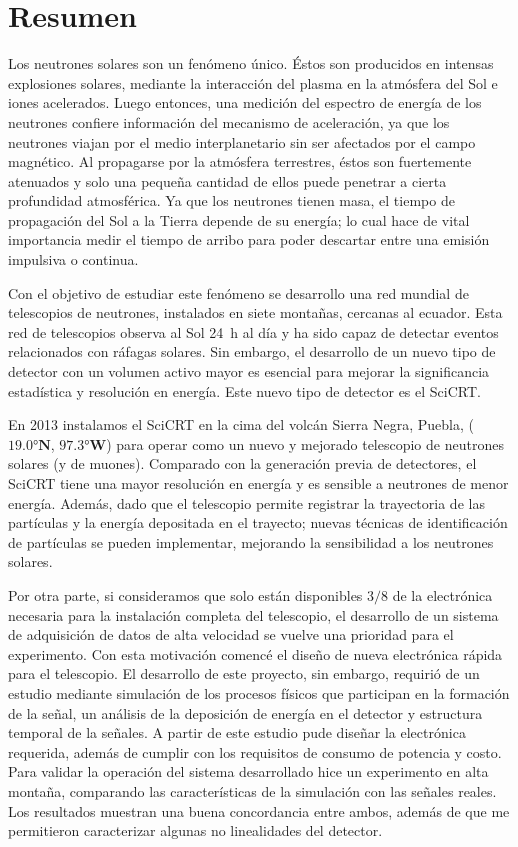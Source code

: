 
\pagestyle{empty}
\chapter{Resumen}

Los neutrones solares son un fenómeno único. Éstos son producidos en intensas explosiones solares, mediante la interacción del plasma en la atmósfera del Sol e iones acelerados. Luego entonces, una medición del espectro de energía de los neutrones confiere información del mecanismo de aceleración, ya que  los neutrones viajan por el medio interplanetario sin ser afectados por el campo magnético. Al propagarse por la atmósfera terrestres, éstos son fuertemente atenuados y solo una pequeña cantidad de ellos puede penetrar a cierta profundidad atmosférica. Ya que los neutrones tienen masa, el tiempo de propagación del Sol a la Tierra depende de su energía; lo cual hace de vital importancia medir el tiempo de arribo para poder descartar entre una emisión impulsiva o continua.

Con el objetivo de estudiar este fenómeno se desarrollo una red mundial de telescopios de neutrones, instalados en siete montañas, cercanas al ecuador. Esta red de telescopios observa al Sol \SI{24}{\hour} al día y ha sido capaz de detectar eventos relacionados con ráfagas solares. Sin embargo, el desarrollo de un nuevo tipo de detector con un volumen activo mayor es esencial para mejorar la significancia estadística y resolución en energía. Este nuevo tipo de detector es el SciCRT.

En \num{2013} instalamos el SciCRT en la cima del volcán Sierra Negra, Puebla, ($\ang{19.0}\mathbf{N}$, $\ang{97.3}\mathbf{W}$) para operar como un nuevo y mejorado telescopio de neutrones solares (y de muones). Comparado con la generación previa de detectores, el SciCRT tiene una mayor resolución en energía y es sensible a neutrones de menor energía. Además, dado que el telescopio permite registrar la trayectoria de las partículas y la energía depositada en el trayecto; nuevas técnicas de identificación de partículas se pueden implementar, mejorando la sensibilidad a los neutrones solares.

Por otra parte, si consideramos que solo están disponibles $3/8$ de la electrónica necesaria para la instalación completa del telescopio, el desarrollo de un sistema de adquisición de datos de alta velocidad se vuelve una prioridad para el experimento. Con esta motivación comencé el diseño de nueva electrónica rápida para el telescopio. El desarrollo de este proyecto, sin embargo, requirió de un estudio mediante simulación de los procesos físicos que participan en la formación de la señal, un análisis de la deposición de energía en el detector y estructura temporal de la señales. A partir de este estudio pude diseñar la electrónica requerida, además de cumplir con los requisitos de consumo de potencia y costo. Para validar la operación del sistema desarrollado hice un experimento en alta montaña, comparando las características de la simulación con las señales reales. Los resultados muestran una buena concordancia entre ambos, además de que me permitieron caracterizar algunas no linealidades del detector.

